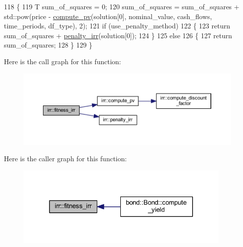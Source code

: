 \begin{DoxyCode}
118     \{
119         T sum\_of\_squares = 0;
120         sum\_of\_squares = sum\_of\_squares + std::pow(price - \hyperlink{namespaceirr_ac3411cd2ad174f399c525d8d17dcdad0}{compute\_pv}(solution[0], nominal\_value,
       cash\_flows, time\_periods, df\_type), 2);
121         \textcolor{keywordflow}{if} (use\_penalty\_method)
122         \{
123             \textcolor{keywordflow}{return} sum\_of\_squares + \hyperlink{namespaceirr_abd1d21a84003df6b46dc32c3a30d2269}{penalty\_irr}(solution[0]);
124         \}
125         \textcolor{keywordflow}{else}
126         \{
127             \textcolor{keywordflow}{return} sum\_of\_squares;
128         \}
129     \}
\end{DoxyCode}
Here is the call graph for this function\+:
\nopagebreak
\begin{figure}[H]
\begin{center}
\leavevmode
\includegraphics[width=350pt]{namespaceirr_aced01c5e5ef9e171a3b892275d442f8d_cgraph}
\end{center}
\end{figure}
Here is the caller graph for this function\+:
\nopagebreak
\begin{figure}[H]
\begin{center}
\leavevmode
\includegraphics[width=299pt]{namespaceirr_aced01c5e5ef9e171a3b892275d442f8d_icgraph}
\end{center}
\end{figure}
\mbox{\label{namespaceirr_abd1d21a84003df6b46dc32c3a30d2269}} 
